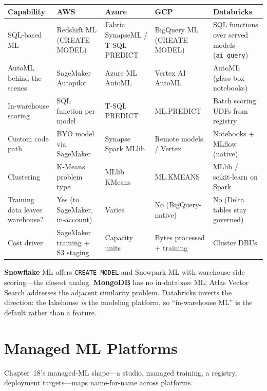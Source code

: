 \begin{center}
\footnotesize
\begin{tabular}{@{}p{2.4cm}p{2.9cm}p{2.9cm}p{2.9cm}p{2.9cm}@{}}
\toprule
\textbf{Capability} & \textbf{AWS} & \textbf{Azure} & \textbf{GCP} & \textbf{Databricks} \\
\midrule
SQL-based ML & Redshift ML (CREATE MODEL) & Fabric SynapseML / T-SQL PREDICT & BigQuery ML (CREATE MODEL) & SQL functions over served models (\texttt{ai\_query}) \\
AutoML behind the scenes & SageMaker Autopilot & Azure ML AutoML & Vertex AI AutoML & AutoML (glass-box notebooks) \\
In-warehouse scoring & SQL function per model & T-SQL PREDICT & ML.PREDICT & Batch scoring UDFs from registry \\
Custom code path & BYO model via SageMaker & Synapse Spark MLlib & Remote models / Vertex & Notebooks + MLflow (native) \\
Clustering & K-Means problem type & MLlib KMeans & ML.KMEANS & MLlib / scikit-learn on Spark \\
\addlinespace
Training data leaves warehouse? & Yes (to SageMaker, in-account) & Varies & No (BigQuery-native) & No (Delta tables stay governed) \\
Cost driver & SageMaker training + S3 staging & Capacity units & Bytes processed + training & Cluster DBUs \\
\bottomrule
\end{tabular}
\end{center}

\noindent \textbf{Snowflake} ML offers \texttt{CREATE MODEL} and Snowpark ML with warehouse-side
scoring---the closest analog. \textbf{MongoDB} has no in-database ML; Atlas Vector Search
addresses the adjacent similarity problem. Databricks inverts the direction: the lakehouse
\emph{is} the modeling platform, so ``in-warehouse ML'' is the default rather than a feature.

\section{Managed ML Platforms}
%
Chapter~18's managed-ML shape---a studio, managed training, a registry, deployment targets---maps
name-for-name across platforms.

